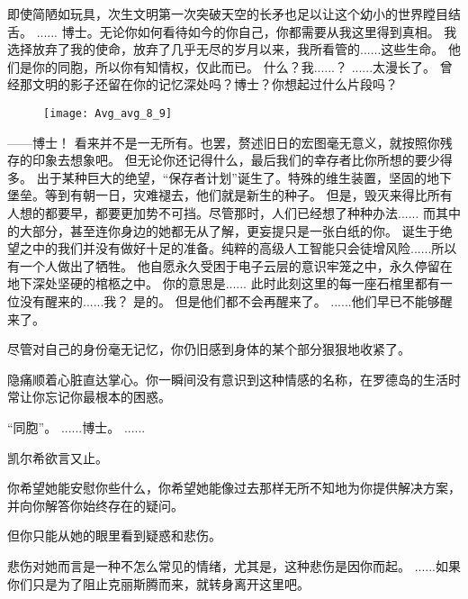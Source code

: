 \documentclass[openany]{book}
\begin{document}
\begin{dialogue}
     即使简陋如玩具，次生文明第一次突破天空的长矛也足以让这个幼小的世界瞠目结舌。
     ......
     博士。无论你如何看待如今的你自己，你都需要从我这里得到真相。
     我选择放弃了我的使命，放弃了几乎无尽的岁月以来，我所看管的......这些生命。
     他们是你的同胞，所以你有知情权，仅此而已。
     什么？我......？
     ......太漫长了。
     曾经那文明的影子还留在你的记忆深处吗？博士？你想起过什么片段吗？
    \begin{figure}[h]
        \centering
        \texttt{[image: Avg\_avg\_8\_9]}
    \end{figure}
     ——博士！
     看来并不是一无所有。也罢，赘述旧日的宏图毫无意义，就按照你残存的印象去想象吧。
     但无论你还记得什么，最后我们的幸存者比你所想的要少得多。
     出于某种巨大的绝望，“保存者计划”诞生了。特殊的维生装置，坚固的地下堡垒。等到有朝一日，灾难褪去，他们就是新生的种子。
     但是，毁灭来得比所有人想的都要早，都要更加势不可挡。尽管那时，人们已经想了种种办法......
     而其中的大部分，甚至连你身边的她都无从了解，更妄提只是一张白纸的你。
     诞生于绝望之中的我们并没有做好十足的准备。纯粹的高级人工智能只会徒增风险......所以有一个人做出了牺牲。
     他自愿永久受困于电子云层的意识牢笼之中，永久停留在地下深处坚硬的棺柩之中。
     你的意思是......
     此时此刻这里的每一座石棺里都有一位没有醒来的......我？
     是的。
     但是他们都不会再醒来了。
     ......他们早已不能够醒来了。\par
    尽管对自己的身份毫无记忆，你仍旧感到身体的某个部分狠狠地收紧了。\par
    隐痛顺着心脏直达掌心。你一瞬间没有意识到这种情感的名称，在罗德岛的生活时常让你忘记你最根本的困惑。\par
    “同胞”。
     ......博士。
     ......\par
    凯尔希欲言又止。\par
    你希望她能安慰你些什么，你希望她能像过去那样无所不知地为你提供解决方案，并向你解答你始终存在的疑问。\par
    但你只能从她的眼里看到疑惑和悲伤。\par
    悲伤对她而言是一种不怎么常见的情绪，尤其是，这种悲伤是因你而起。
     ......如果你们只是为了阻止克丽斯腾而来，就转身离开这里吧。

\end{dialogue}
\end{document}
